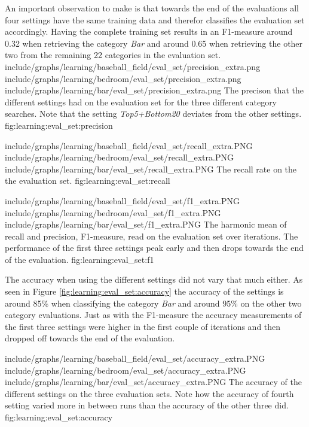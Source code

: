 An important observation to make is that towards the end of the evaluations all four settings have the same training data and therefor classifies the evaluation set accordingly. Having the complete training set results in an F1-measure around 0.32 when retrieving the category \emph{Bar} and around 0.65 when retrieving the other two from the remaining 22 categories in the evaluation set.
\tripfigurenear
{include/graphs/learning/baseball_field/eval_set/precision_extra.png}
{include/graphs/learning/bedroom/eval_set/precision_extra.png}
{include/graphs/learning/bar/eval_set/precision_extra.png}
{The precison that the different settings had on the evaluation set for the three different category searches. Note that the setting \emph{Top5+Bottom20} deviates from the other settings.}
{fig:learning:eval_set:precision}

\tripfigurenear
{include/graphs/learning/baseball_field/eval_set/recall_extra.PNG}
{include/graphs/learning/bedroom/eval_set/recall_extra.PNG}
{include/graphs/learning/bar/eval_set/recall_extra.PNG}
{The recall rate on the the evaluation set.}
{fig:learning:eval_set:recall}

\tripfigurenear
{include/graphs/learning/baseball_field/eval_set/f1_extra.PNG}
{include/graphs/learning/bedroom/eval_set/f1_extra.PNG}
{include/graphs/learning/bar/eval_set/f1_extra.PNG}
{The harmonic mean of recall and precision, F1-measure, read on the evaluation set over iterations. The performance of the first three settings peak early and then drops towards the end of the evaluation.}
{fig:learning:eval_set:f1}

The accuracy when using the different settings did not vary that much either. As seen in Figure \ref{fig:learning:eval_set:accuracy} the accuracy of the settings is around 85\% when classifying the category \emph{Bar} and around 95\% on the other two category evaluations. Just as with the F1-measure the accuracy measurements of the first three settings were higher in the first couple of iterations and then dropped off towards the end of the evaluation. 

\tripfigure
{include/graphs/learning/baseball_field/eval_set/accuracy_extra.PNG}
{include/graphs/learning/bedroom/eval_set/accuracy_extra.PNG}
{include/graphs/learning/bar/eval_set/accuracy_extra.PNG}
{The accuracy of the different settings on the three evaluation sets. Note how the accuracy of fourth setting varied more in between runs than the accuracy of the other three did.}
{fig:learning:eval_set:accuracy}

